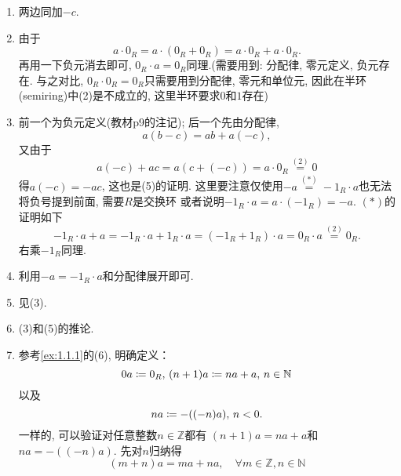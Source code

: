 \begin{solution}
    \begin{enumerate}[(1)]
        \item 两边同加$-c$.
        \item 由于
        \[
            a \cdot 0_R = a \cdot (0_R + 0_R) = a \cdot 0_R + a \cdot 0_R.
        \]
        再用一下负元消去即可, $0_R \cdot a = 0_R$同理.(需要用到: 分配律, 零元定义, 
    负元存在. 与之对比, $0_R \cdot 0_R = 0_R$只需要用到分配律, 零元和单位元, 
    因此在半环(semiring)中(2)是不成立的, 这里半环要求$0$和$1$存在)
        \item 前一个为负元定义(教材p9的注记); 后一个先由分配律, 
    \[
        a(b - c) = ab + a(-c),
    \]
    又由于
    \[
        a(-c) + ac = a(c + (-c)) = a \cdot 0_R \overset{(2)}= 0
    \]
    得$a(-c) = -ac$, 这也是(5)的证明.
    这里要注意仅使用$-a \overset{(*)}= -1_R \cdot a$也无法将负号提到前面, 需要$R$是交换环
    或者说明$-1_R \cdot a = a \cdot (-1_R) = -a$.
    $(*)$的证明如下
    \[
        -1_R \cdot a + a = -1_R \cdot a + 1_R \cdot a = (-1_R + 1_R) \cdot a = 0_R \cdot a \overset{(2)}= 0_R.
    \]
    右乘$-1_R$同理.
        \item 利用$-a = -1_R \cdot a$和分配律展开即可.
        \item 见(3).
        \item (3)和(5)的推论.
        \item 参考\ref{ex:1.1.1}的(6), 明确定义：
        \[
            0a \mathrel{\coloneqq} 0_R,\, (n + 1)a \mathrel{\coloneqq} na + a,\, n \in \mathbb{N}
        \]
        以及
        \[
            na \mathrel{\coloneqq} -((-n)a),\, n < 0.
        \]
        一样的, 可以验证对任意整数$n \in \mathbb{Z}$都有
        $(n + 1)a = na + a$和$na = -((-n)a)$.
        先对$n$归纳得
    \begin{equation}
        (m + n)a = ma + na, \quad \forall m \in \mathbb{Z}, n \in \mathbb{N}
        \tag{i}
        \label{eq:1.2.1.7}
    \end{equation}
        

\end{enumerate}
\end{solution}
